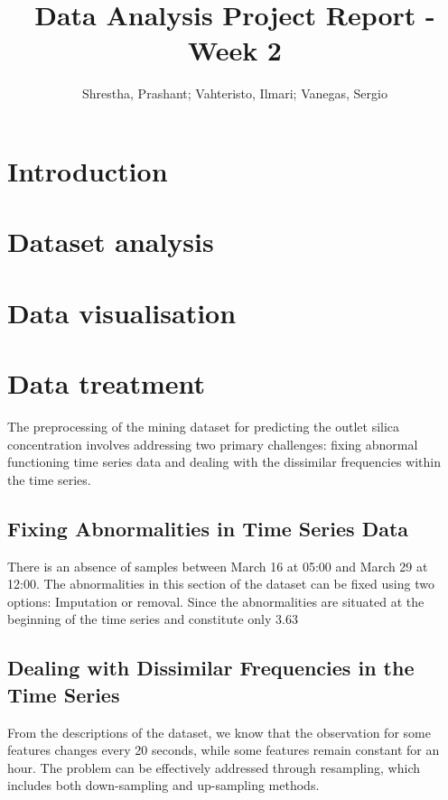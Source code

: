 \documentclass{article}
\title{Data Analysis Project Report - Week 2}
\author{Shrestha, Prashant; Vahteristo, Ilmari; Vanegas, Sergio}
\begin{document}
\maketitle

\section{Introduction} %

\section{Dataset analysis}

\section{Data visualisation}

\section{Data treatment}
The preprocessing of the mining dataset for predicting the outlet silica concentration involves addressing two primary challenges: fixing abnormal functioning time series data and dealing with the dissimilar frequencies within the time series.

\subsection{Fixing Abnormalities in Time Series Data}

There is an absence of samples between March 16 at 05:00 and March 29 at 12:00. The abnormalities in this section of the dataset can be fixed using two options: Imputation or removal. Since the abnormalities are situated at the beginning of the time series and constitute only 3.63%

\subsection{Dealing with Dissimilar Frequencies in the Time Series}

From the descriptions of the dataset, we know that the observation for some features changes every 20 seconds, while some features remain constant for an hour. The problem can be effectively addressed through resampling, which includes both down-sampling and up-sampling methods. 
\end{document}
